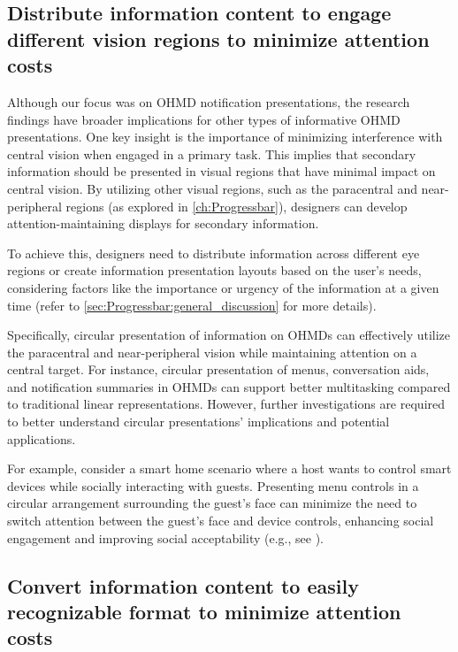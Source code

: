 \subsection{Distribute information content to engage different vision regions to minimize attention costs}
 
Although our focus was on OHMD notification presentations, the research findings have broader implications for other types of informative OHMD presentations. One key insight is the importance of minimizing interference with central vision when engaged in a primary task. This implies that secondary information should be presented in visual regions that have minimal impact on central vision. By utilizing other visual regions, such as the paracentral and near-peripheral regions (as explored in \autoref{ch:Progressbar}), designers can develop attention-maintaining displays for secondary information.

To achieve this, designers need to distribute information across different eye regions or create information presentation layouts based on the user's needs, considering factors like the importance or urgency of the information at a given time (refer to \autoref{sec:Progressbar:general_discussion} for more details).


Specifically, circular presentation of information on OHMDs can effectively utilize the paracentral and near-peripheral vision while maintaining attention on a central target. For instance, circular presentation of menus, conversation aids, and notification summaries in OHMDs can support better multitasking compared to traditional linear representations. However, further investigations are required to better understand circular presentations' implications and potential applications.

For example, consider a smart home scenario where a host wants to control smart devices while socially interacting with guests. Presenting menu controls in a circular arrangement surrounding the guest's face can minimize the need to switch attention between the guest's face and device controls, enhancing social engagement and improving social acceptability (e.g., see \cite{runze_paraglassmenu_2023}).



\subsection{Convert information content to easily recognizable format to minimize attention costs}

